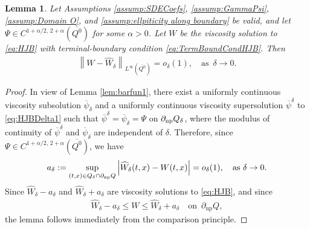 \documentclass[amscd,amssymb,11pt]{article}
\newtheorem{lemma}[theorem]{Lemma}
\numberwithin{theorem}{section}
\numberwithin{equation}{section}
\begin{document}
\begin{lemma}\label{lem:Comparison}
Let Assumptions \ref{assump:SDECoefs}, \ref{assump:GammaPsi}, \ref{assump:Domain O}, and \ref{assump:ellpiticity along boundary} be valid, and let $\Psi\in C^{1+\alpha/2,\,2+\alpha}(\overline{Q^{0}})$ for some $\alpha>0$. Let $W$ be the viscosity solution to \eqref{eq:HJB} with terminal-boundary condition \eqref{eq:TermBoundCondHJB}.
Then
\begin{align*}
\left\|W-\widehat{W}_{\delta}\right\|_{L^{\infty}(\overline{Q^{0}})}=o_{\delta}(1),\quad \text{as }\,\delta\rightarrow 0.
\end{align*}
\end{lemma}
\begin{proof}
In view of Lemma \ref{lem:barfun1}, there exist a uniformly continuous viscosity subsolution $\overline{\psi}_{\delta}$ and a uniformly continuous viscosity supersolution $\overline{\psi}^{\delta}$ to \eqref{eq:HJBDelta1} such that $\overline{\psi}^{\delta}=\overline{\psi}_{\delta}=\Psi$ on $\partial_{{\rm np}} Q_{\delta}$, where the modulus of continuity of $\overline{\psi}^{\delta}$ and $\overline{\psi}_{\delta}$ are independent of $\delta$. Therefore, since $\Psi\in C^{1+\alpha/2,\,2+\alpha}(\overline{Q^{0}})$, we have
\begin{align*}
a_{\delta}:=\sup_{(t,x)\in Q_{\delta}\cap\partial_{\rm np}Q}\left|\widehat{W}_{\delta}(t,x)-W(t,x)\right|=o_{\delta}(1),\quad \text{as }\delta\rightarrow 0.
\end{align*}
Since $\widehat{W}_{\delta}-a_{\delta}$ and $\widehat{W}_{\delta}+a_{\delta}$ are viscosity solutions to \eqref{eq:HJB}, and since
\begin{align*}
\widehat{W}_{\delta}-a_{\delta}\leq W\leq \widehat{W}_{\delta}+a_{\delta}\quad\text{on }\,\partial_{\text{np}}Q,
\end{align*}
the lemma follows immediately from the comparison principle.
\end{proof}
\end{document}
